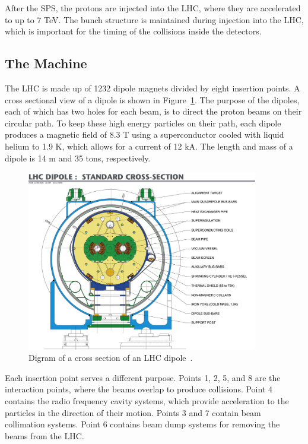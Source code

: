 After the SPS, the protons are injected into the LHC, where they are accelerated to up to 7 TeV.
The bunch structure is maintained during injection into the LHC, which is important for the timing
of the collisions inside the detectors. 

\subsection{The Machine\label{subsec:machine}}

The LHC is made up of 1232 dipole magnets divided by eight insertion points. A cross sectional view
of a dipole is shown in Figure~\ref{fig:lhc_dipole}. The purpose of the
dipoles, each of which has two holes for each beam, is to direct the proton beams on their circular
path. To keep these high energy particles on their path, each dipole produces a magnetic field
of 8.3 T using a superconductor cooled with liquid helium to 1.9 K, which allows for a current
of 12 kA. The length and mass of a dipole is 14 m and 35 tons, respectively.

\begin{figure}[ht]
 \begin{center}
    \includegraphics[width=0.90\textwidth]{figures/experiment/9906025_01.jpeg}
      \end{center}
\caption{Digram of a cross section of an LHC dipole~\cite{Team:40524}.}
\label{fig:lhc_dipole}
\end{figure}

Each insertion point serves a different purpose. Points 1, 2, 5, and 8 are the interaction points, where
the beams overlap to produce collisions. Point 4 contains the radio frequency cavity systems, which
provide acceleration to the particles in the direction of their motion. Points 3 and 7 contain beam
collimation systems. Point 6 contains beam dump systems for removing the beams from the LHC.

